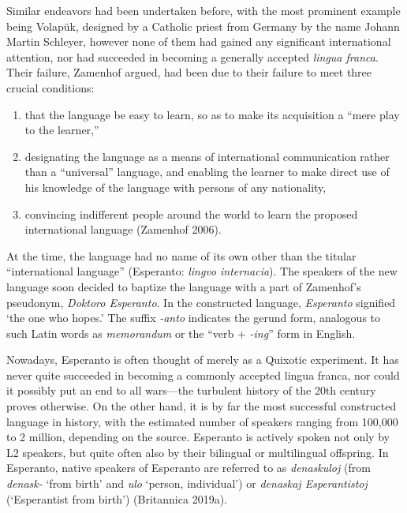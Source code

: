 Similar endeavors had been undertaken before, with the most prominent example being Volapük, designed by a Catholic priest from Germany by the name Johann Martin Schleyer, however none of them had gained any significant international attention, nor had succeeded in becoming a generally accepted \textit{lingua franca}.
Their failure, Zamenhof argued, had been due to their failure to meet three crucial conditions:

\begin{enumerate}
  \item that the language be easy to learn, so as to make its acquisition a ``mere play to the learner,''
  \item designating the language as a means of international communication rather than a ``universal'' language, and enabling the learner to make direct use of his knowledge of the language with persons of any nationality,
  \item convincing indifferent people around the world to learn the proposed international language (Zamenhof 2006).
\end{enumerate}

At the time, the language had no name of its own other than the titular ``international language'' (Esperanto: \textit{lingvo internacia}).
The speakers of the new language soon decided to baptize the language with a part of Zamenhof's pseudonym, \textit{Doktoro Esperanto}.
In the constructed language, \textit{Esperanto} signified `the one who hopes.' The suffix \textit{-anto} indicates the gerund form, analogous to such Latin words as \textit{memorandum} or the ``verb + \textit{-ing}'' form in English.

Nowadays, Esperanto is often thought of merely as a Quixotic experiment.
It has never quite succeeded in becoming a commonly accepted lingua franca, nor could it possibly put an end to all wars---the turbulent history of the 20th century proves otherwise.
On the other hand, it is by far the most successful constructed language in history, with the estimated number of speakers ranging from 100,000 to 2 million, depending on the source.
Esperanto is actively spoken not only by L2 speakers, but quite often also by their bilingual or multilingual offspring.
In Esperanto, native speakers of Esperanto are referred to as \textit{denaskuloj} (from \textit{denask-} `from birth' and \textit{ulo} `person, individual') or \textit{denaskaj Esperantistoj} (`Esperantist from birth')
(Britannica 2019a).

